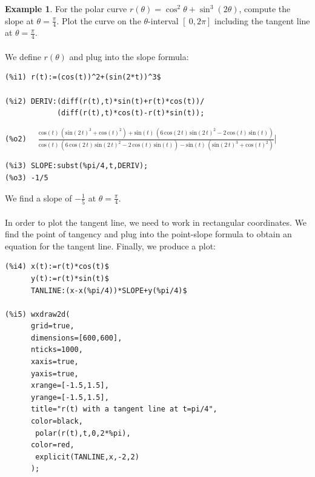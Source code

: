 \documentclass[10.5pt,twoside]{report}
\theoremstyle{definition}
\newtheorem{exmp}{Example}[section]
\begin{document}
\begin{exmp} For the polar curve  $r(\theta)=\cos^2{\theta}+\sin^3{(2\theta)}$, compute the slope at  $\theta=\frac{\pi}{4}$.  Plot the curve on the $\theta$-interval $[\ 0,2\pi]$ including the tangent line at $\theta=\frac{\pi}{4}$.\\

${}$\\

We define $r(\theta)$ and plug into the slope formula:

\begin{verbatim}
(%i1) r(t):=(cos(t))^2+(sin(2*t))^3$

(%i2) DERIV:(diff(r(t),t)*sin(t)+r(t)*cos(t))/
            (diff(r(t),t)*cos(t)-r(t)*sin(t));
\end{verbatim}

\verb|(%o2)  | $\frac{\mathrm{cos}\left( t\right) \,\left( {\mathrm{sin}\left( 2\,t\right) }^{3}+{\mathrm{cos}\left( t\right) }^{2}\right) +\mathrm{sin}\left( t\right) \,\left( 6\,\mathrm{cos}\left( 2\,t\right) \,{\mathrm{sin}\left( 2\,t\right) }^{2}-2\,\mathrm{cos}\left( t\right) \,\mathrm{sin}\left( t\right) \right) }{\mathrm{cos}\left( t\right) \,\left( 6\,\mathrm{cos}\left( 2\,t\right) \,{\mathrm{sin}\left( 2\,t\right) }^{2}-2\,\mathrm{cos}\left( t\right) \,\mathrm{sin}\left( t\right) \right) -\mathrm{sin}\left( t\right) \,\left( {\mathrm{sin}\left( 2\,t\right) }^{3}+{\mathrm{cos}\left( t\right) }^{2}\right) }$|

\begin{verbatim}
(%i3) SLOPE:subst(%pi/4,t,DERIV);
(%o3) -1/5
\end{verbatim}

We find a slope of $-\frac{1}{5}$ at $\theta=\frac{\pi}{4}$.\\
${}$\\
In order to plot the tangent line, we need to work in rectangular coordinates.  We find the point of tangency and plug into the point-slope formula to obtain an equation for the tangent line.  Finally, we produce a plot:

\begin{verbatim}
(%i4) x(t):=r(t)*cos(t)$
      y(t):=r(t)*sin(t)$
      TANLINE:(x-x(%pi/4))*SLOPE+y(%pi/4)$
      
(%i5) wxdraw2d(
      grid=true,
      dimensions=[600,600],
      nticks=1000,
      xaxis=true,
      yaxis=true,
      xrange=[-1.5,1.5],
      yrange=[-1.5,1.5],
      title="r(t) with a tangent line at t=pi/4",
      color=black,
       polar(r(t),t,0,2*%pi),
      color=red,
       explicit(TANLINE,x,-2,2)
      );
\end{verbatim}


\end{exmp}
\end{document}
